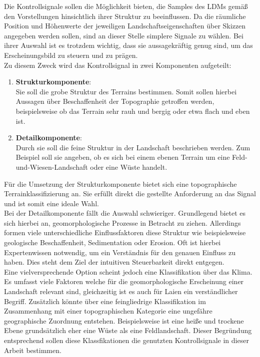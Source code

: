 Die Kontrollsignale sollen die Möglichkeit bieten, die Samples des \ac{LDM}s gemäß den Vorstellungen hinsichtlich ihrer Struktur zu beeinflussen. Da die räumliche Position und Höhenwerte der jeweiligen Landschaftseigenschaften über Skizzen angegeben werden sollen, sind an dieser Stelle simplere Signale zu wählen. Bei ihrer Auswahl ist es trotzdem wichtig, dass sie aussagekräftig genug sind, um das Erscheinungsbild zu steuern und zu prägen. \\
Zu diesem Zweck wird das Kontrollsignal in zwei Komponenten aufgeteilt:
\begin{enumerate}
    \item \textbf{Strukturkomponente}: \\
    Sie soll die grobe Struktur des Terrains bestimmen. Somit sollen hierbei Aussagen über Beschaffenheit der Topographie getroffen werden, beispielsweise ob das Terrain sehr rauh und bergig oder etwa flach und eben ist. 
    \item \textbf{Detailkomponente}: \\
    Durch sie soll die feine Struktur in der Landschaft beschrieben werden. Zum Beispiel soll sie angeben, ob es sich bei einem ebenen Terrain um eine Feld-und-Wiesen-Landschaft oder eine Wüste handelt. 
\end{enumerate}
Für die Umsetzung der Strukturkomponente bietet sich eine topographische Terrainklassifizierung an. Sie erfüllt direkt die gestellte Anforderung an das Signal und ist somit eine ideale Wahl. \\
Bei der Detailkomponente fällt die Auswahl schwieriger. Grundlegend bietet es sich hierbei an, geomorphologische Prozesse in Betracht zu ziehen. Allerdings formen viele unterschiedliche Einflussfaktoren diese Struktur wie beispielsweise geologische Beschaffenheit, Sedimentation oder Erosion. Oft ist hierbei Expertenwissen notwendig, um ein Verständnis für den genauen Einfluss zu haben. Dies steht dem Ziel der intuitiven Steuerbarkeit direkt entgegen. \\
Eine vielversprechende Option scheint jedoch eine Klassifikation über das Klima. Es umfasst viele Faktoren welche für die geomorphologische Erscheinung einer Landschaft relevant sind, gleichzeitig ist es auch für Laien ein verständlicher Begriff. Zusätzlich könnte über eine feingliedrige Klassifikation im Zusammenhang mit einer topographischen Kategorie eine ungefähre geographische Zuordnung entstehen. Beispielsweise ist eine heiße und trockene Ebene grundsätzlich eher eine Wüste als eine Feldlandschaft. Dieser Begründung entsprechend sollen diese Klassfikationen die genutzten Kontrollsignale in dieser Arbeit bestimmen.  


